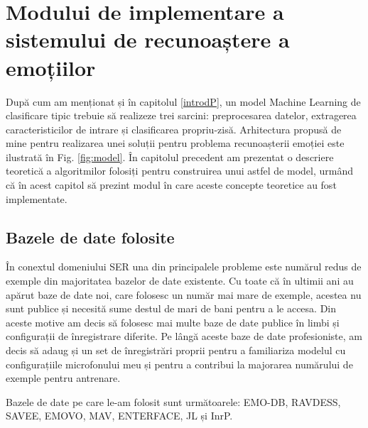 \documentclass[a4paper,12pt]{book}
\begin{document}
				\section{Modului de implementare a sistemului de recunoaștere a emoțiilor}
				
				După cum am menționat și în capitolul \ref{introdP}, un model Machine Learning de clasificare tipic trebuie să realizeze trei sarcini: preprocesarea datelor, extragerea caracteristicilor de intrare și clasificarea propriu-zisă. Arhitectura propusă de mine pentru realizarea unei soluții pentru problema recunoașterii emoției este ilustrată în Fig. \ref{fig:model}. În capitolul precedent am prezentat o descriere teoretică a algoritmilor folosiți pentru construirea unui astfel de model, urmând că în acest capitol să prezint modul în care aceste concepte teoretice au fost implementate.
				
					\subsection {Bazele de date folosite} \label{datasets}
					În conextul domeniului SER una din principalele probleme este numărul redus de exemple din majoritatea bazelor de date existente. Cu toate că în ultimii ani au apărut baze de date noi, care folosesc un număr mai mare de exemple, acestea nu sunt publice și necesită sume destul de mari de bani pentru a le accesa. Din aceste motive am decis să folosesc mai multe baze de date publice în limbi și configurații de înregistrare diferite. Pe lângă aceste baze de date profesioniste, am decis să adaug și un set de înregistrări proprii pentru a familiariza modelul cu configurațiile microfonului meu și pentru a contribui la majorarea numărului de exemple pentru antrenare.\par
					
					\newpage
					Bazele de date pe care le-am folosit sunt următoarele: EMO-DB, RAVDESS, SAVEE, EMOVO, MAV, ENTERFACE, JL și InrP.
					
\end{document}
